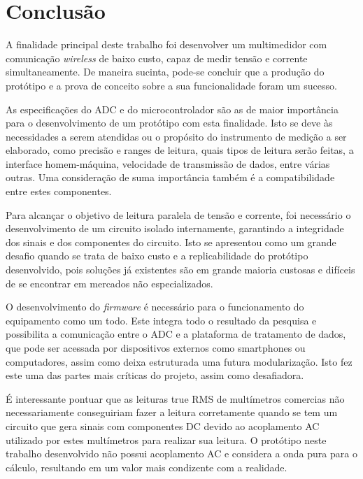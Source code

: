 \chapter{Conclusão}\label{cap:conclusoeseperspectivas}

A finalidade principal deste trabalho foi desenvolver um multimedidor com comunicação \textit{wireless} de baixo custo, capaz de medir tensão e corrente simultaneamente. De maneira sucinta, pode-se concluir que a produção do protótipo e a prova de conceito sobre a sua funcionalidade foram um sucesso.

As especificações do \gls{ADC} e do microcontrolador são as de maior importância para o desenvolvimento de um protótipo com esta finalidade. Isto se deve às necessidades a serem atendidas ou o propósito do instrumento de medição a ser elaborado, como precisão e ranges de leitura, quais tipos de leitura serão feitas, a interface homem-máquina, velocidade de transmissão de dados, entre várias outras. Uma consideração de suma importância também é a compatibilidade entre estes componentes.

Para alcançar o objetivo de leitura paralela de tensão e corrente, foi necessário o desenvolvimento de um circuito isolado internamente, garantindo a integridade dos sinais e dos componentes do circuito. Isto se apresentou como um grande desafio quando se trata de baixo custo e a replicabilidade do protótipo desenvolvido, pois soluções já existentes são em grande maioria custosas e difíceis de se encontrar em mercados não especializados.

O desenvolvimento do \textit{firmware} é necessário para o funcionamento do equipamento como um todo. Este integra todo o resultado da pesquisa e possibilita a comunicação entre o ADC e a plataforma de tratamento de dados, que pode ser acessada por dispositivos externos como smartphones ou computadores, assim como deixa estruturada uma futura modularização. Isto fez este uma das partes mais críticas do projeto, assim como desafiadora.

É interessante pontuar que as leituras true RMS de multímetros comercias não necessariamente conseguiriam fazer a leitura corretamente quando se tem um circuito que gera sinais com componentes DC devido ao acoplamento AC utilizado por estes multímetros para realizar sua leitura. O protótipo neste trabalho desenvolvido não possui acoplamento AC e considera a onda pura para o cálculo, resultando em um valor mais condizente com a realidade.

